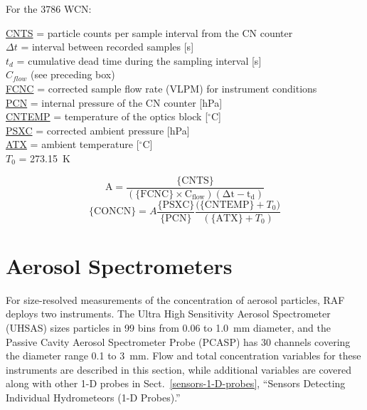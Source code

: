 \documentclass[
]{book}
\begin{document}
For the 3786 WCN:

\protect\hyperlink{cnts}{CNTS} = particle counts per sample interval from the CN counter\\
\(\Delta t\) = interval
between recorded samples {[}s{]}\\
\(t_{d}\) = cumulative dead time during the sampling interval {[}s{]}\\
\(C_{flow}\) (see preceding box)\\
\protect\hyperlink{fcnc}{FCNC} = corrected sample flow rate (VLPM) for instrument conditions\\
\protect\hyperlink{pcn}{PCN} = internal pressure of the CN counter {[}hPa{]}\\
\protect\hyperlink{cntemp}{CNTEMP} = temperature of the optics block {[}\(^{\circ}\)C{]}\\
\href{./4-the-state-of-the-atmosphere.html\#psx}{PSXC} = corrected ambient pressure {[}hPa{]}\\
\href{./4-the-state-of-the-atmosphere.html\#ambient-t}{ATX} = ambient temperature {[}\(^{\circ}\)C{]}\\
\(T_{0}\) = 273.15~K

\begin{equation}
\mathrm{A=\frac{\{CNTS\}}{\mathrm{(\{FCNC\}\times C_{flow})}(\Delta t-t_{d})}}
\label{eq:CONCN2box1}
\end{equation}
\begin{equation}
\mathrm{\{CONCN\}}=A\frac{\mathrm{\{PSXC\}}}{\mathrm{\{PCN\}}}\frac{\mathrm{(\{CNTEMP\}}+T_{0})}{(\mathrm{\{ATX\}}+T_{0})}
\label{eq:cwCONCN2box2}
\end{equation}

\hypertarget{aerosol-spec}{%
\section{Aerosol Spectrometers}\label{aerosol-spec}}

For size-resolved measurements of the concentration of aerosol particles, RAF deploys two instruments. The Ultra High Sensitivity Aerosol Spectrometer (UHSAS) sizes particles in 99 bins from 0.06 to 1.0~\foreignlanguage{greek}{m}m diameter, and the Passive Cavity Aerosol Spectrometer Probe (PCASP) has 30 channels covering the diameter range 0.1 to 3~\foreignlanguage{greek}{m}m. Flow and total concentration variables for these instruments are described in this section, while additional variables are covered along with other 1-D probes in Sect.~\ref{sensors-1-D-probes}, ``Sensors Detecting Individual Hydrometeors (1-D Probes).''
\end{document}
